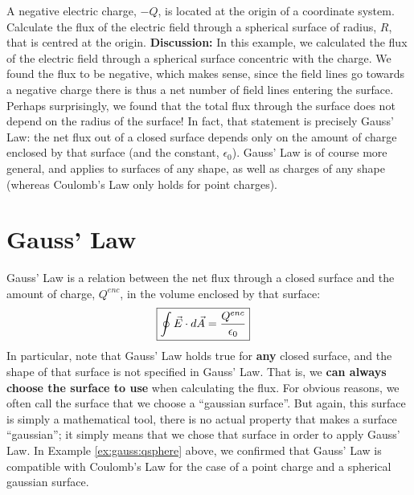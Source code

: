 \begin{example}{A negative electric charge, $-Q$, is located at the origin of a coordinate system. Calculate the flux of the electric field through a spherical surface of radius, $R$, that is centred at the origin.}
\textbf{Discussion: }In this example, we calculated the flux of the electric field through a spherical surface concentric with the charge. We found the flux to be negative, which makes sense, since the field lines go towards a negative charge there is thus a net number of field lines entering the surface. Perhaps surprisingly, we found that the total flux through the surface does not depend on the radius of the surface! In fact, that statement is precisely Gauss' Law: the net flux out of a closed surface depends only on the amount of charge enclosed by that surface (and the constant, $\epsilon_0$). Gauss' Law is of course more general, and applies to surfaces of any shape, as well as charges of any shape (whereas Coulomb's Law only holds for point charges). 
\end{example}

\section{Gauss' Law}
Gauss' Law is a relation between the net flux through a closed surface and the amount of charge, $Q^{enc}$, in the volume enclosed by that surface:
\begin{align*}
\Aboxed{\oint \vec E\cdot d\vec A=\frac{Q^{enc}}{\epsilon_0}}
\end{align*}
In particular, note that Gauss' Law holds true for \textbf{any} closed surface, and the shape of that surface is not specified in Gauss' Law. That is, we \textbf{can always choose the surface to use} when calculating the flux. For obvious reasons, we often call the surface that we choose a ``gaussian surface''. But again, this surface is simply a mathematical tool, there is no actual property that makes a surface ``gaussian''; it simply means that we chose that surface in order to apply Gauss' Law. In Example \ref{ex:gauss:qsphere} above, we confirmed that Gauss' Law is compatible with Coulomb's Law for the case of a point charge and a spherical gaussian surface. 

